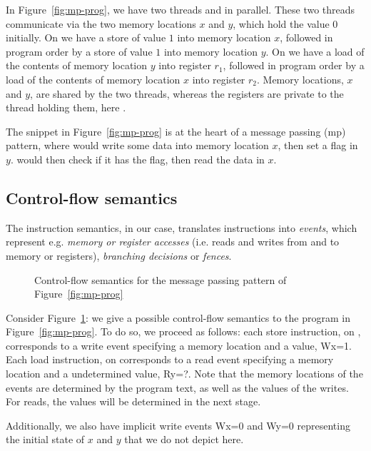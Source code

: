 In Figure~\ref{fig:mp-prog}, we have two threads  and  in
parallel. These two threads communicate via the two memory locations $x$ and
$y$, which hold the value $0$ initially. On  we have a store of value
$1$ into memory location $x$, followed in program order by a store of value $1$
into memory location $y$. On  we have a load of the contents of memory
location $y$ into register $r_1$, followed in program order by a load of the
contents of memory location $x$ into register $r_2$. Memory locations, \eg $x$
and $y$, are shared by the two threads, whereas the registers are private to
the thread holding them, here .

The snippet in Figure~\ref{fig:mp-prog} is at the heart of a message
passing (\textsf{mp}) pattern, where  would write some data into memory
location $x$, then set a flag in $y$.  would then check if it has the
flag, then read the data in $x$.

\subsection{Control-flow semantics}
The instruction semantics, in our case, translates instructions into
\emph{events}, which represent e.g. \emph{memory or register accesses} (i.e.
reads and writes from and to memory or registers), \emph{branching decisions}
or \emph{fences}.

\begin{figure}[!h]
\begin{center}
\end{center}
\caption{Control-flow semantics for the message passing pattern of Figure~\ref{fig:mp-prog}\label{fig:mp-cf}}
\end{figure}

Consider Figure~\ref{fig:mp-cf}: we give a possible control-flow semantics to
the program in Figure~\ref{fig:mp-prog}. To do so, we proceed as follows: each
store instruction, \eg {} on , corresponds to a write event
specifying a memory location and a value, \eg Wx=1. Each load instruction, \eg
{} on  corresponds to a read event specifying a memory
location and a undetermined value, \eg Ry=?.  Note that the memory locations of
the events are determined by the program text, as well as the values of the
writes. For reads, the values will be determined in the next stage.

Additionally, we also have implicit write events Wx=0 and Wy=0 representing the
initial state of $x$ and $y$ that we do not depict here.

